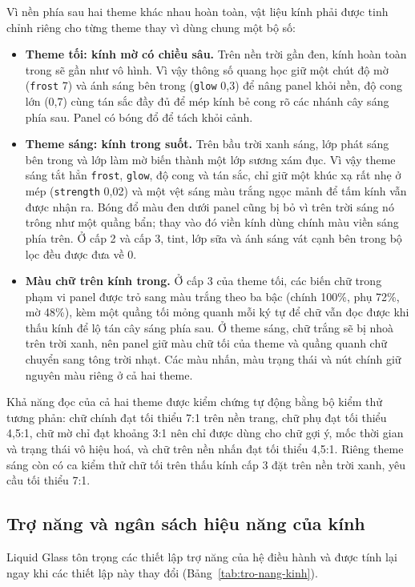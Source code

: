 Vì nền phía sau hai theme khác nhau hoàn toàn, vật liệu kính phải được tinh chỉnh riêng cho từng theme thay vì dùng chung một bộ số:
\begin{itemize}[label=$\bullet$]
    \item \textbf{Theme tối: kính mờ có chiều sâu.} Trên nền trời gần đen, kính hoàn toàn trong sẽ gần như vô hình. Vì vậy thông số quang học giữ một chút độ mờ (\texttt{frost} 7) và ánh sáng bên trong (\texttt{glow} 0,3) để nâng panel khỏi nền, độ cong lớn (0,7) cùng tán sắc đầy đủ để mép kính bẻ cong rõ các nhánh cây sáng phía sau. Panel có bóng đổ để tách khỏi cảnh.
    \item \textbf{Theme sáng: kính trong suốt.} Trên bầu trời xanh sáng, lớp phát sáng bên trong và lớp làm mờ biến thành một lớp sương xám đục. Vì vậy theme sáng tắt hẳn \texttt{frost}, \texttt{glow}, độ cong và tán sắc, chỉ giữ một khúc xạ rất nhẹ ở mép (\texttt{strength} 0,02) và một vệt sáng màu trắng ngọc mảnh để tấm kính vẫn được nhận ra. Bóng đổ màu đen dưới panel cũng bị bỏ vì trên trời sáng nó trông như một quầng bẩn; thay vào đó viền kính dùng chính màu viền sáng phía trên. Ở cấp 2 và cấp 3, tint, lớp sữa và ánh sáng vát cạnh bên trong bộ lọc đều được đưa về 0.
    \item \textbf{Màu chữ trên kính trong.} Ở cấp 3 của theme tối, các biến chữ trong phạm vi panel được trỏ sang màu trắng theo ba bậc (chính 100\%, phụ 72\%, mờ 48\%), kèm một quầng tối mỏng quanh mỗi ký tự để chữ vẫn đọc được khi thấu kính để lộ tán cây sáng phía sau. Ở theme sáng, chữ trắng sẽ bị nhoà trên trời xanh, nên panel giữ màu chữ tối của theme và quầng quanh chữ chuyển sang tông trời nhạt. Các màu nhấn, màu trạng thái và nút chính giữ nguyên màu riêng ở cả hai theme.
\end{itemize}

Khả năng đọc của cả hai theme được kiểm chứng tự động bằng bộ kiểm thử tương phản: chữ chính đạt tối thiểu 7:1 trên nền trang, chữ phụ đạt tối thiểu 4,5:1, chữ mờ chỉ đạt khoảng 3:1 nên chỉ được dùng cho chữ gợi ý, mốc thời gian và trạng thái vô hiệu hoá, và chữ trên nền nhấn đạt tối thiểu 4,5:1. Riêng theme sáng còn có ca kiểm thử chữ tối trên thấu kính cấp 3 đặt trên nền trời xanh, yêu cầu tối thiểu 7:1.

\subsection{Trợ năng và ngân sách hiệu năng của kính}
\label{subsec:tro-nang-kinh}

Liquid Glass tôn trọng các thiết lập trợ năng của hệ điều hành và được tính lại ngay khi các thiết lập này thay đổi (Bảng~\ref{tab:tro-nang-kinh}).

